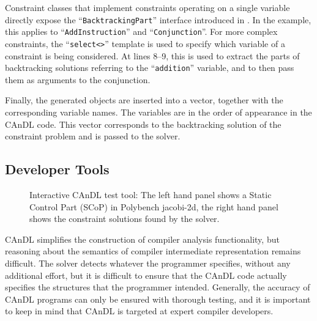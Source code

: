     Constraint classes that implement constraints operating on a single
    variable directly expose the ``{\tt BacktrackingPart}'' interface
    introduced in .
    In the example, this applies to ``{\tt AddInstruction}'' and
    ``{\tt Conjunction}''.
    For more complex constraints, the ``{\tt select<>}'' template is used to
    specify which variable of a constraint is being considered.
    At lines 8--9, this is used to extract the parts of backtracking solutions
    referring to the ``{\tt addition}'' variable, and to then pass them as
    arguments to the conjunction.

    Finally, the generated objects are inserted into a vector, together with the
    corresponding variable names.
    The variables are in the order of appearance in the CAnDL code.
    This vector corresponds to the backtracking solution of the constraint
    problem and is passed to the solver.

\subsection{Developer Tools}

\begin{figure}[t]
\centering
\setlength{\fboxsep}{-0.5pt}\setlength{\fboxrule}{0.5pt}
\caption{Interactive CAnDL test tool: The left hand panel shows a Static Control
        Part (SCoP) in Polybench jacobi-2d, the right hand panel shows the
        constraint solutions found by the solver.}
\label{fig:gui}
\end{figure}

    CAnDL simplifies the construction of compiler analysis functionality, but
    reasoning about the semantics of compiler intermediate representation
    remains difficult.
    The solver detects whatever the programmer specifies, without any additional
    effort, but it is difficult to ensure that the CAnDL code actually
    specifies the structures that the programmer intended.
    Generally, the accuracy of CAnDL programs can only be ensured with
    thorough testing, and it is important to keep in mind that CAnDL is targeted
    at expert compiler developers.

